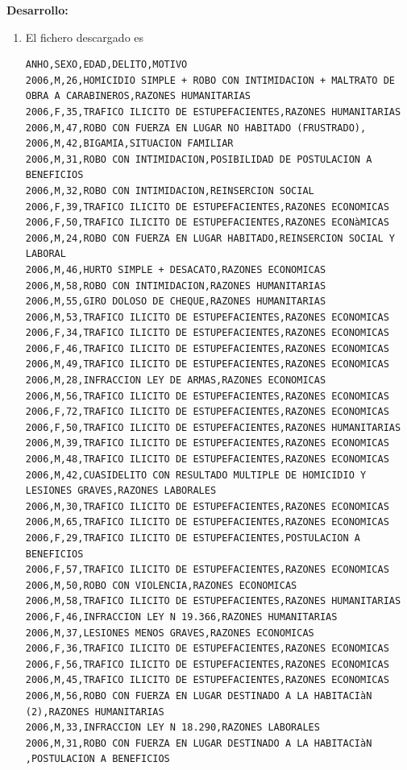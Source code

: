 \documentclass[11pt]{article}
\begin{document}
\begin{enumerate}
\textbf{Desarrollo: } 
\begin{enumerate}
\item El fichero descargado es  
\begin{verbatim}
ANHO,SEXO,EDAD,DELITO,MOTIVO
2006,M,26,HOMICIDIO SIMPLE + ROBO CON INTIMIDACION + MALTRATO DE OBRA A CARABINEROS,RAZONES HUMANITARIAS 
2006,F,35,TRAFICO ILICITO DE ESTUPEFACIENTES,RAZONES HUMANITARIAS 
2006,M,47,ROBO CON FUERZA EN LUGAR NO HABITADO (FRUSTRADO),
2006,M,42,BIGAMIA,SITUACION FAMILIAR
2006,M,31,ROBO CON INTIMIDACION,POSIBILIDAD DE POSTULACION A BENEFICIOS
2006,M,32,ROBO CON INTIMIDACION,REINSERCION SOCIAL
2006,F,39,TRAFICO ILICITO DE ESTUPEFACIENTES,RAZONES ECONOMICAS
2006,F,50,TRAFICO ILICITO DE ESTUPEFACIENTES,RAZONES ECONàMICAS
2006,M,24,ROBO CON FUERZA EN LUGAR HABITADO,REINSERCION SOCIAL Y LABORAL
2006,M,46,HURTO SIMPLE + DESACATO,RAZONES ECONOMICAS
2006,M,58,ROBO CON INTIMIDACION,RAZONES HUMANITARIAS 
2006,M,55,GIRO DOLOSO DE CHEQUE,RAZONES HUMANITARIAS
2006,M,53,TRAFICO ILICITO DE ESTUPEFACIENTES,RAZONES ECONOMICAS
2006,F,34,TRAFICO ILICITO DE ESTUPEFACIENTES,RAZONES ECONOMICAS
2006,F,46,TRAFICO ILICITO DE ESTUPEFACIENTES,RAZONES ECONOMICAS
2006,M,49,TRAFICO ILICITO DE ESTUPEFACIENTES,RAZONES ECONOMICAS
2006,M,28,INFRACCION LEY DE ARMAS,RAZONES ECONOMICAS
2006,M,56,TRAFICO ILICITO DE ESTUPEFACIENTES,RAZONES ECONOMICAS
2006,F,72,TRAFICO ILICITO DE ESTUPEFACIENTES,RAZONES ECONOMICAS
2006,F,50,TRAFICO ILICITO DE ESTUPEFACIENTES,RAZONES HUMANITARIAS 
2006,M,39,TRAFICO ILICITO DE ESTUPEFACIENTES,RAZONES ECONOMICAS
2006,M,48,TRAFICO ILICITO DE ESTUPEFACIENTES,RAZONES ECONOMICAS
2006,M,42,CUASIDELITO CON RESULTADO MULTIPLE DE HOMICIDIO Y LESIONES GRAVES,RAZONES LABORALES
2006,M,30,TRAFICO ILICITO DE ESTUPEFACIENTES,RAZONES ECONOMICAS
2006,M,65,TRAFICO ILICITO DE ESTUPEFACIENTES,RAZONES ECONOMICAS
2006,F,29,TRAFICO ILICITO DE ESTUPEFACIENTES,POSTULACION A BENEFICIOS
2006,F,57,TRAFICO ILICITO DE ESTUPEFACIENTES,RAZONES ECONOMICAS
2006,M,50,ROBO CON VIOLENCIA,RAZONES ECONOMICAS
2006,M,58,TRAFICO ILICITO DE ESTUPEFACIENTES,RAZONES HUMANITARIAS 
2006,F,46,INFRACCION LEY N 19.366,RAZONES HUMANITARIAS
2006,M,37,LESIONES MENOS GRAVES,RAZONES ECONOMICAS
2006,F,36,TRAFICO ILICITO DE ESTUPEFACIENTES,RAZONES ECONOMICAS
2006,F,56,TRAFICO ILICITO DE ESTUPEFACIENTES,RAZONES ECONOMICAS
2006,M,45,TRAFICO ILICITO DE ESTUPEFACIENTES,RAZONES ECONOMICAS
2006,M,56,ROBO CON FUERZA EN LUGAR DESTINADO A LA HABITACIàN (2),RAZONES HUMANITARIAS 
2006,M,33,INFRACCION LEY N 18.290,RAZONES LABORALES
2006,M,31,ROBO CON FUERZA EN LUGAR DESTINADO A LA HABITACIàN ,POSTULACION A BENEFICIOS

\end{verbatim}
\end{enumerate}
\end{enumerate}
\end{document}
